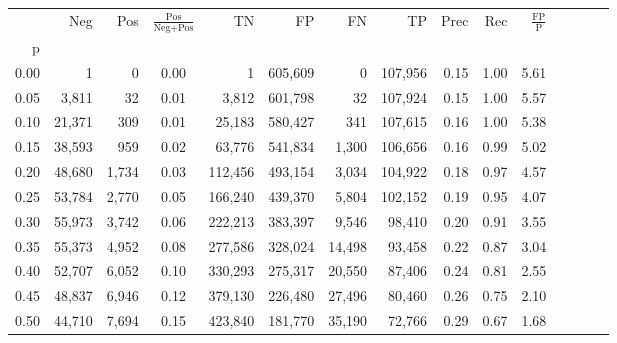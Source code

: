 \begin{tabular}{rrrcrrrrrrrrrrr}
\toprule
{} &     Neg &    Pos & $\frac{\text{Pos}}{\text{Neg}+\text{Pos}}$ &       TN &       FP &       FN &       TP &  Prec &   Rec & $\frac{\text{FP}}{\text{P}}$ \\
p    &         &        &                                            &          &          &          &          &       &       &                              \\
\midrule
0.00 &       1 &      0 &                                       0.00 &        1 &  605,609 &        0 &  107,956 &  0.15 &  1.00 &                         5.61 \\
0.05 &   3,811 &     32 &                                       0.01 &    3,812 &  601,798 &       32 &  107,924 &  0.15 &  1.00 &                         5.57 \\
0.10 &  21,371 &    309 &                                       0.01 &   25,183 &  580,427 &      341 &  107,615 &  0.16 &  1.00 &                         5.38 \\
0.15 &  38,593 &    959 &                                       0.02 &   63,776 &  541,834 &    1,300 &  106,656 &  0.16 &  0.99 &                         5.02 \\
0.20 &  48,680 &  1,734 &                                       0.03 &  112,456 &  493,154 &    3,034 &  104,922 &  0.18 &  0.97 &                         4.57 \\
0.25 &  53,784 &  2,770 &                                       0.05 &  166,240 &  439,370 &    5,804 &  102,152 &  0.19 &  0.95 &                         4.07 \\
0.30 &  55,973 &  3,742 &                                       0.06 &  222,213 &  383,397 &    9,546 &   98,410 &  0.20 &  0.91 &                         3.55 \\
0.35 &  55,373 &  4,952 &                                       0.08 &  277,586 &  328,024 &   14,498 &   93,458 &  0.22 &  0.87 &                         3.04 \\
0.40 &  52,707 &  6,052 &                                       0.10 &  330,293 &  275,317 &   20,550 &   87,406 &  0.24 &  0.81 &                         2.55 \\
0.45 &  48,837 &  6,946 &                                       0.12 &  379,130 &  226,480 &   27,496 &   80,460 &  0.26 &  0.75 &                         2.10 \\
0.50 &  44,710 &  7,694 &                                       0.15 &  423,840 &  181,770 &   35,190 &   72,766 &  0.29 &  0.67 &                         1.68 \\

\end{tabular}
